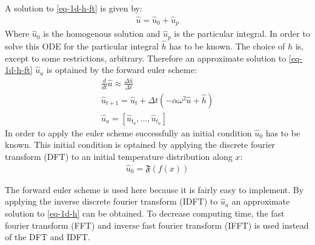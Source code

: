 A solution to \ref{eq-1d-h-ft} is given by:
\begin{gather}
\hat{u} = \hat{u}_{0} + \hat{u}_{p}
\end{gather}
Where \(\hat{u}_{0}\) is the homogenous solution and \(\hat{u}_{p}\) is the particular integral.
In order to solve this ODE for the particular integral \(\hat{h}\) has to be known. \cite{Papula2015}
The choice of \(h\) is, except to some restrictions, arbitrary.
Therefore an approximate solution to \ref{eq-1d-h-ft} \(\hat{u}_{a}\) is optained by the forward euler scheme:
\begin{gather}
\frac{d}{dt} \hat{u} \approx \frac{\Delta \hat{u}}{\Delta t} \\
\hat{u}_{t+1} = \hat{u}_{t} + \Delta t (-\alpha\omega^{2}\hat{u} + \hat{h}) \label{eq-1d-h-es} \\
\hat{u}_{a} = [\hat{u}_{t_{0}}, ..., \hat{u}_{t_{n}}]
\end{gather}
In order to apply the euler scheme successfully an initial condition   \(\hat{u}_{0}\) has to be known. 
This initial condition is optained by applying the discrete fourier transform (DFT) to an initial temperature distribution along \(x\):
\begin{gather}
\hat{u}_{0} = \mathfrak{F}(f(x)) 
\end{gather} 
\cite{Gustafsson2011b}

The forward euler scheme is used here because it is fairly easy to implement.
By applying the  inverse discrete fourier transform (IDFT) to \(\hat{u}_{a}\) an approximate solution to \ref{eq-1d-h} can be obtained.
To decrease computing time, the fast fourier transform (FFT) and inverse fast fourier transform (IFFT) is used instead of the DFT and IDFT.

